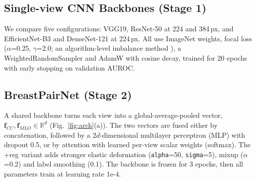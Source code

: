 \documentclass[conference]{IEEEtran}
\begin{document}
\subsection{Single-view CNN Backbones (Stage 1)}

We compare five configurations: VGG19, ResNet-50 \cite{7} at 224 and 384\,px, and EfficientNet-B3 \cite{9} and DenseNet-121 \cite{8} at 224\,px. All use ImageNet weights, focal loss \cite{5} ($\alpha$=0.25, $\gamma$=2.0; an algorithm-level imbalance method \cite{15}), a WeightedRandomSampler and AdamW with cosine decay, trained for 20 epochs with early stopping on validation AUROC.

\subsection{BreastPairNet (Stage 2)}

A shared backbone turns each view into a global-average-pooled vector, $\mathbf{f}_{CC},\mathbf{f}_{MLO}\in\mathbb{R}^d$ (Fig.~\ref{fig:arch}(a)). The two vectors are fused either by concatenation, followed by a $2d$-dimensional multilayer perceptron (MLP) with dropout 0.5, or by attention with learned per-view scalar weights (softmax). The +reg variant adds stronger elastic deformation (\texttt{alpha}=50, \texttt{sigma}=5), mixup ($\alpha$=0.2) and label smoothing (0.1). The backbone is frozen for 3 epochs, then all parameters train at learning rate 1e-4.
\end{document}

